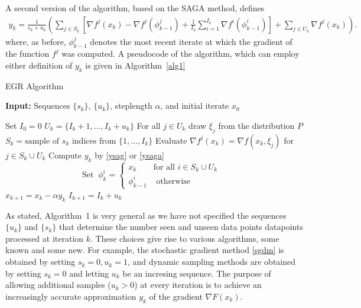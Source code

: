 \documentclass[11pt]{article}
\begin{document}
A second version of the algorithm, based on the SAGA method, defines 
\begin{align}  \label{ysaga}
      y_k =  \frac{1}{s_k+u_k} \left(  \sum_{j \in S_k} \left[  \nabla f^j(x_{k}) -   \nabla f^j(\phi_{k-1}^j) + \frac{1}{I_{k}} \sum_{i = 1}^{I_{k} }  \nabla f^i (\phi^i_{k-1})  \right] + \sum_{j \in U_k}  \nabla f^j(x_k)\right).
\end{align}
 where, as before,  $\phi_{k-1}^j$ denotes the most recent iterate at which the gradient of the function $f^j$ was computed.
 A pseudocode of the algorithm, which can employ either definition of $y_k$ is given in Algorithm~\ref{alg1}

\bigskip
\begin{algorithm}
	[H] 
	\caption{EGR Algorithm}
	\label{alg1}
	{\bf Input:} Sequences $\{ s_k\}$, $\{ u_k \}$, steplength $ \alpha $, and initial iterate $x_0$
	\begin{algorithmic}
		[1] 
		\State Set $I_{0} = 0$
		\State $U_k =\{I_{k}+1,\ldots, I_{k}+u_k \}$ 
		\State For  all $j \in U_k$ draw $\xi_j$ from the distribution $P$ 
		\State $S_k = \mbox{sample of } s_k \mbox{ indices from }\{ 1, \ldots ,I_{k}\}$ 
           \State Evaluate $\nabla f^j(x_k) = \nabla f(x_k, \xi_j) $ for $j \in S_k \cup U_k$
           \State Compute $y_k$ by \eqref{ysag} or \eqref{ysaga}
		\State
		\begin{equation}  \label{chico} \mbox{Set   }  \  \phi^i_k =
		\begin{cases} 
  x_k & \mbox{for all $i \in S_k\cup U_k$ } \\
  \phi^i_{k-1} & \mbox{ otherwise} 
 \end{cases}
\end{equation}
		\State $x_{k+1} = x_k - \alpha y_k$ 
		\State $I_{k+1} = I_{k} +u_k$ 
		\EndLoop 
	\end{algorithmic}
\end{algorithm}


As stated, Algorithm~1 is very general as we have not specified the sequences $\{ u_k \}$ and $\{ s_k \}$ that determine the number seen and unseen data points datapoints processed at iteration $k$. These choices give rise to various algorithms, some known and some new. For example,  the stochastic gradient method \eqref{sgdm} is obtained by setting $s_k=0, u_k =1$, and dynamic sampling methods are obtained by setting $s_k=0$ and letting $u_k$ be an incresing sequence. The purpose of allowing additional samples ($u_k >0$) at every iteration is to achieve an increasingly accurate approximation $y_k$ of the gradient $\nabla F(x_k)$. 
\end{document}
